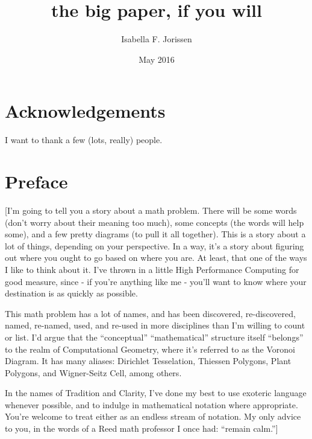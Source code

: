 \documentclass[12pt,twoside]{reedthesis}
\title{the big paper, if you will}
\author{Isabella F. Jorissen}
\date{May 2016}
\begin{document}
  \maketitle
  \frontmatter %
  \pagestyle{empty} %

    \chapter*{Acknowledgements}
	I want to thank a few (lots, really) people.

    \chapter*{Preface}
    [I'm going to tell you a story about a math problem. There will be some words (don't worry about their meaning too much), some concepts (the words will help some), and a few pretty diagrams (to pull it all together). This is a story about a lot of things, depending on your perspective. In a way, it's a story about figuring out where you ought to go based on where you are. At least, that one of the ways I like to think about it. I've thrown in a little High Performance Computing for good measure, since - if you're anything like me - you'll want to know where your destination is as quickly as possible.

    This math problem has a lot of names, and has been discovered, re-discovered, named, re-named, used, and re-used in more disciplines than I'm willing to count or list. I'd argue that the ``conceptual'' ``mathematical'' structure itself ``belongs'' to the realm of Computational Geometry, where it's referred to as the Voronoi Diagram. It has many aliases: Dirichlet Tesselation, Thiessen Polygons, Plant Polygons, and Wigner-Seitz Cell, among others. 

    In the names of Tradition and Clarity, I've done my best to use exoteric language whenever possible, and to indulge in mathematical notation where appropriate. You're welcome to treat either as an endless stream of notation. My only advice to you, in the words of a Reed math professor I once had: ``remain calm.'']

\end{document}

